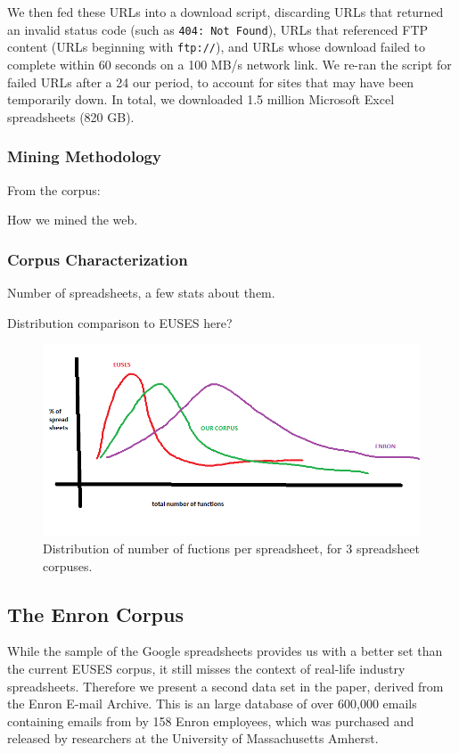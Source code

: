 \documentclass[conference]{IEEEtran}
\begin{document}
We then fed these URLs into a download script, discarding URLs that returned an invalid status code (such as \texttt{404: Not Found}), URLs that referenced FTP content (URLs beginning with \texttt{ftp://}), and URLs whose download failed to complete within 60 seconds on a 100 MB/s network link. 
%
We re-ran the script for failed URLs after a 24 our period, to account for sites that may have been temporarily down. 
%
In total, we downloaded 1.5 million Microsoft Excel spreadsheets (820 GB). 

\subsubsection{Mining Methodology}

From the corpus: 


How we mined the web.

\subsubsection{Corpus Characterization}

Number of spreadsheets, a few stats about them.

Distribution comparison to EUSES here?


\begin{figure}[!t]
\centering
\includegraphics[width=\columnwidth]{functions.png}
\caption{Distribution of number of fuctions per spreadsheet, for 3 spreadsheet corpuses.}
\label{fig:functions}
\end{figure}

\subsection{The Enron Corpus}

While the sample of the Google spreadsheets provides us with a better set than the current EUSES corpus, it still misses the context of real-life industry spreadsheets. Therefore we present a second data set in the paper, derived from the Enron E-mail Archive. This is an large database of over 600,000 emails containing emails from by 158 Enron employees, which was purchased and released by researchers at the University of Massachusetts Amherst. 
\end{document}

